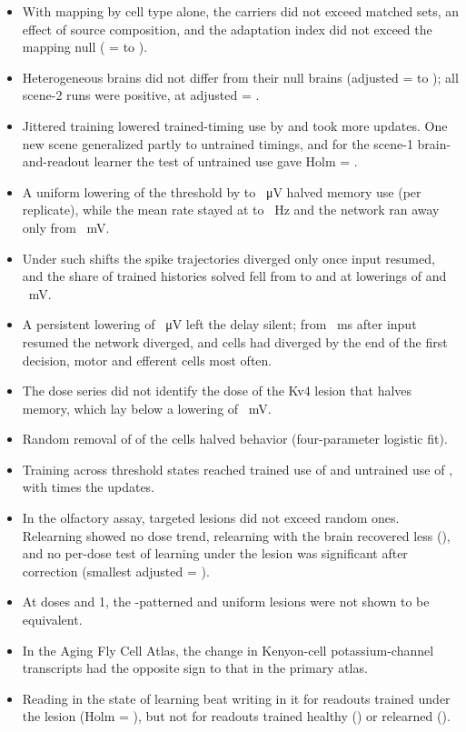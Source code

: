 \begin{itemize}
same-type damping the mushroom-body tests of healthy circuits failed.
\item With mapping by cell type alone, the carriers did not exceed matched sets, an effect of source composition, and the
adaptation index did not exceed the mapping null (\Pv{} =  to ).
\item Heterogeneous brains did not differ from their null brains (adjusted \Pv{} =  to ); all
 scene-2 runs were positive, at adjusted \Pv{} = .
\item Jittered training lowered trained-timing use by  and took  more updates. One new scene
generalized partly to untrained timings, and for the scene-1 brain-and-readout learner the test of untrained use gave Holm
\Pv{} = .
\item A uniform lowering of the threshold by  to ~μV halved memory use (per replicate), while the mean
rate stayed at  to ~Hz and the network ran away only from ~mV.
\item Under such shifts the spike trajectories diverged only once input resumed, and the share of trained histories solved fell
from  to  and  at lowerings of  and ~mV.
\item A persistent lowering of ~μV left the delay silent; from ~ms after input resumed the network
diverged, and  cells had diverged by the end of the first decision, motor and efferent cells most often.
\item The dose series did not identify the dose of the Kv4 lesion that halves memory, which lay below a lowering of
~mV.
\item Random removal of  of the cells halved behavior (four-parameter logistic fit).
\item Training across threshold states reached trained use of  and untrained use of , with 
times the updates.
\item In the olfactory assay, targeted lesions did not exceed random ones. Relearning showed no dose trend, relearning with the
brain recovered less (), and no per-dose test of learning under the lesion was significant after correction
(smallest adjusted \Pv{} = ).
\item At doses  and 1, the -patterned and uniform lesions were not shown to be equivalent.
\item In the Aging Fly Cell Atlas, the change in Kenyon-cell potassium-channel transcripts had the opposite sign to that in the
primary atlas.
\item Reading in the state of learning beat writing in it for readouts trained under the lesion (Holm \Pv{} = ), but
not for readouts trained healthy () or relearned ().
\end{itemize}
